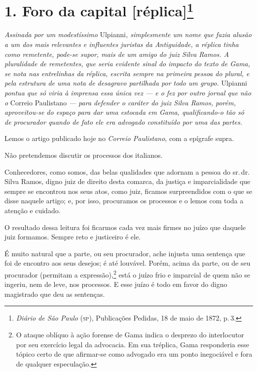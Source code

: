 \chapter{1. Foro da capital {[}réplica{]}\footnote{\emph{Diário de São Paulo} (\textsc{sp}), Publicações Pedidas,
  18 de maio de 1872, p.\,3.}} %

\begin{didascalia}
\emph{Assinada por um modestíssimo} Ulpianni\emph{, simplesmente um nome
que fazia alusão a um dos mais relevantes e influentes juristas da
Antiguidade, a réplica tinha como remetente, pode-se supor, mais de um
amigo do juiz Silva Ramos. A pluralidade de remetentes, que seria
evidente sinal do impacto do texto de Gama, se nota nas entrelinhas da
réplica, escrita sempre na primeira pessoa do plural, e pela estrutura
de uma nota de desagravo partilhada por todo um grupo.} Ulpianni
\emph{pontua que só viria à imprensa essa única vez --- e o fez por outro
jornal que não o} Correio Paulistano \emph{--- para defender o caráter do
juiz Silva Ramos, porém, aproveitou-se do espaço para dar uma estocada
em Gama, qualificando-o tão só de procurador quando de fato ele era
advogado constituído por uma das partes.}
\end{didascalia}

Lemos o artigo publicado hoje no \emph{Correio Paulistano}, com a
epígrafe supra.

Não pretendemos discutir os processos dos italianos.

Conhecedores, como somos, das belas qualidades que adornam a pessoa do
sr.\,dr.\,Silva Ramos, digno juiz de direito desta comarca, da justiça e
imparcialidade que sempre se encontrou nos seus atos, como juiz, ficamos
surpreendidos com o que se disse naquele artigo; e, por isso, procuramos
os processos e o lemos com toda a atenção e cuidado.

O resultado dessa leitura foi ficarmos cada vez mais firmes no juízo que
daquele juiz formamos. Sempre reto e justiceiro é ele.

É muito natural que a parte, ou seu procurador, ache injusta uma
sentença que foi de encontro aos seus desejos; é até louvável. Porém,
acima da parte, ou de seu procurador (permitam a expressão),\footnote{
  O ataque oblíquo à ação forense de Gama indica o desprezo do
  interlocutor por seu exercício legal da advocacia. Em sua tréplica,
  Gama responderia esse tópico certo de que afirmar-se como advogado era
  um ponto inegociável e fora de qualquer especulação.} está o juízo
frio e imparcial de quem não se ingeriu, nem de leve, nos processos. E
esse juízo é todo em favor do digno magistrado que deu as sentenças.

